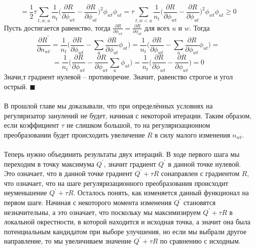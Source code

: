 \documentclass[12pt]{article}
\newenvironment{Proof} 
	{\par\noindent{\bf Доказательство.}} 
	{\hfill$\blacksquare$}
\renewcommand{\geq}{\geqslant}
\begin{document}
\begin{Proof}
\[\]
\[
= \frac12 \tau \sum\limits_{t, w, u}  \frac{1}{n_{t}} \bigg(  \frac{\partial{R}}{\partial{\phi_{wt}}}  -  \frac{\partial{R}}{\partial{\phi_{ut}}}  \bigg)^2 \phi_{wt} \phi_{ut} = \tau \sum\limits_{t, w < u}  \frac{1}{n_{t}} \bigg(  \frac{\partial{R}}{\partial{\phi_{wt}}}  -  \frac{\partial{R}}{\partial{\phi_{ut}}}  \bigg)^2 \phi_{wt} \phi_{ut} \geq 0
\]
Пусть достигается равенство, тогда $\frac{\partial{R}}{\partial{\phi_{wt}}}  =  \frac{\partial{R}}{\partial{\phi_{ut}}}$ для всех $u$ и $w$. Тогда
\[
\frac{\partial{R^{\prime}}}{\partial{n_{wt}}} = \frac{1}{n_t} \bigg( \frac{\partial{R}}{\partial{\phi_{wt}}} - \sum_{u}  \frac{\partial{R}}{\partial{\phi_{ut}}} \phi_{ut} \bigg) = \frac{1}{n_t} \bigg( \frac{\partial{R}}{\partial{\phi_{wt}}} - \sum_{u}  \frac{\partial{R}}{\partial{\phi_{wt}}} \phi_{ut} \bigg) =
\]
\[
=\frac{1}{n_t} \bigg( \frac{\partial{R}}{\partial{\phi_{wt}}} - \frac{\partial{R}}{\partial{\phi_{wt}}} \sum_{u} \phi_{ut} \bigg)  = \frac{1}{n_t} \bigg( \frac{\partial{R}}{\partial{\phi_{wt}}} - \frac{\partial{R}}{\partial{\phi_{wt}}} \bigg) = 0
\]
Значи,т градиент нулевой -- противоречие. Значит, равенство строгое и угол острый.
\end{Proof}\ \\
\ \\
В прошлой главе мы доказывали, что при определённых условиях на регуляризатор занулений не будет, начиная с некоторой итерации. Таким образом, если коэффициент $\tau$ не слишком большой, то на регуляризационном преобразовании будет происходить увеличение $R$ в силу малого изменения $n_{wt}$.\\
\ \\
Теперь нужно объединить результаты двух итераций. В ходе первого шага мы переходим в точку максимума $Q^{\prime}$, значит градиент $Q^{\prime}$ в данной точке нулевой. Это означает, что в данной точке градиент $Q^{\prime} + \tau R$ сонаправлен с градиентом $R$, что означает, что на шаге регуляризационного преобразования происходит неуменьшение $Q^{\prime} + \tau R$. Осталось понять, как изменяется данный функционал на первом шаге. Начиная с некоторого момента изменения $Q^{\prime}$ становятся незначительны, а это означает, что поскольку мы максимизируем $Q^{\prime} + \tau R$ в локальной окрестности, в которой находится и исходная точка, а значит она была потенциальным кандидатом при выборе улучшения, но если мы выбрали другое направление, то мы увеличиваем значение $Q^{\prime} + \tau R$ по сравнению с исходным.\\
\end{document}
